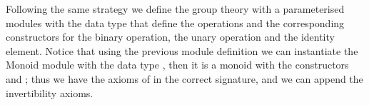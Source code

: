 \noindent
Following the same strategy we define the group theory with a parameterised
modules with the data type that define the operations and the corresponding
constructors for the binary operation, the unary operation and the identity
element. Notice that using the previous module definition we can instantiate
the Monoid module with the data type , then it is a monoid
with the constructors  and ; thus we have the axioms of
 in the correct signature, and we can append the
invertibility axioms.

\begin{code}
  \>[0]%
  \>[64I]%
  \>[65I]\AgdaSymbol{\{}\AgdaSpace{}%
  \AgdaSymbol{:}\AgdaSpace{}%
  \AgdaSpace{}%
  \AgdaSpace{}%
  \AgdaSpace{}%
  \AgdaSpace{}%
  \AgdaSpace{}%
  \AgdaSymbol{\}}\<%
  \\
  \>[.][@{}l@{}]\<[65I]%
  \>[13]\AgdaSymbol{(}%
  \>[21]\AgdaSymbol{:}\AgdaSpace{}%
  \AgdaSpace{}%
  \AgdaSymbol{(}\AgdaInductiveConstructor{[]}\AgdaSpace{}%
  \AgdaOperator{\AgdaInductiveConstructor{,}}\AgdaSpace{}%
  \AgdaSymbol{))}\<%
  \\%
  \>[13]\AgdaSymbol{(}%
  \>[21]\AgdaSymbol{:}\AgdaSpace{}%
  \AgdaSpace{}%
  \AgdaSymbol{(}\AgdaOperator{\AgdaFunction{[}}\AgdaSpace{}%
    \AgdaSpace{}%
    \AgdaOperator{\AgdaFunction{]}}\AgdaSpace{}%
  \AgdaOperator{\AgdaInductiveConstructor{,}}\AgdaSpace{}%
  \AgdaSymbol{))}\<%
  \\%
  \>[13]\AgdaSymbol{(}%
  \>[20]\AgdaSymbol{:}\AgdaSpace{}%
  \AgdaSpace{}%
  \AgdaSymbol{((}\AgdaSpace{}%
  \AgdaSpace{}%
  \AgdaOperator{\AgdaFunction{[}}\AgdaSpace{}%
    \AgdaSpace{}%
    \AgdaOperator{\AgdaFunction{]}}\AgdaSymbol{)}\AgdaSpace{}%
  \AgdaOperator{\AgdaInductiveConstructor{,}}\AgdaSpace{}%
  \AgdaSymbol{))}\<%
  \\
  \>[.][@{}l@{}]\<[64I]%
  \>[7]\<%
  \\
  \>[0][@{}l@{\AgdaIndent{0}}]%
  \>[2]\AgdaSpace{}%
  \AgdaSpace{}%

\end{code}
